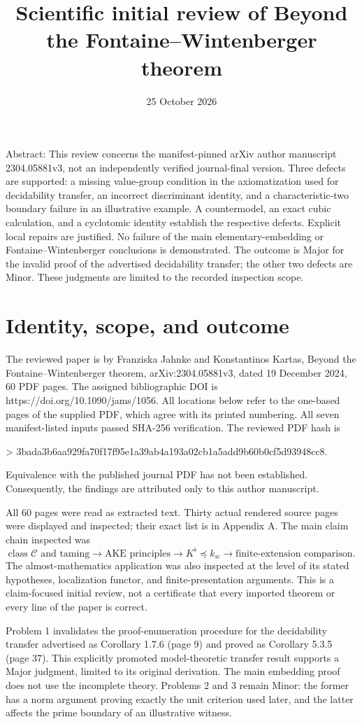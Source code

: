 \documentclass[10pt]{article}
\title{Scientific initial review of
Beyond the Fontaine–Wintenberger theorem}
\author{}
\date{25 October 2026}
\begin{document}
\maketitle
Abstract: This review concerns the manifest-pinned arXiv author manuscript 2304.05881v3, not an independently verified journal-final version. Three defects are supported: a missing value-group condition in the axiomatization used for decidability transfer, an incorrect discriminant identity, and a characteristic-two boundary failure in an illustrative example. A countermodel, an exact cubic calculation, and a cyclotomic identity establish the respective defects. Explicit local repairs are justified. No failure of the main elementary-embedding or Fontaine–Wintenberger conclusions is demonstrated. The outcome is Major for the invalid proof of the advertised decidability transfer; the other two defects are Minor. These judgments are limited to the recorded inspection scope.\par
\section*{Identity, scope, and outcome}
The reviewed paper is by Franziska Jahnke and Konstantinos Kartas, Beyond the Fontaine–Wintenberger theorem, arXiv:2304.05881v3, dated 19 December 2024, 60 PDF pages. The assigned bibliographic DOI is https://doi.org/10.1090/jams/1056. All locations below refer to the one-based pages of the supplied PDF, which agree with its printed numbering. All seven manifest-listed inputs passed SHA-256 verification. The reviewed PDF hash is\par
> 3bada3b6aa929fa70f17f95e1a39ab4a193a02cb1a5add9b60b0cf5d93948cc8.\par
Equivalence with the published journal PDF has not been established. Consequently, the findings are attributed only to this author manuscript.\par
All 60 pages were read as extracted text. Thirty actual rendered source pages were displayed and inspected; their exact list is in Appendix A. The main claim chain inspected was \[\text{class }\mathcal C\text{ and taming}
 \longrightarrow\text{AKE principles}
 \longrightarrow K^\flat\preceq k_w
 \longrightarrow\text{finite-extension comparison}.\] The almost-mathematics application was also inspected at the level of its stated hypotheses, localization functor, and finite-presentation arguments. This is a claim-focused initial review, not a certificate that every imported theorem or every line of the paper is correct.\par
Problem 1 invalidates the proof-enumeration procedure for the decidability transfer advertised as Corollary 1.7.6 (page 9) and proved as Corollary 5.3.5 (page 37). This explicitly promoted model-theoretic transfer result supports a Major judgment, limited to its original derivation. The main embedding proof does not use the incomplete theory. Problems 2 and 3 remain Minor: the former has a norm argument proving exactly the unit criterion used later, and the latter affects the prime boundary of an illustrative witness.\par
\end{document}
